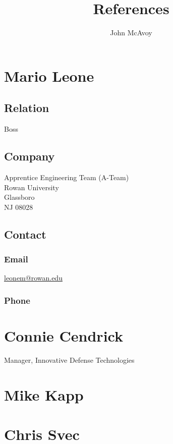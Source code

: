 \documentclass{article}
\title{References}
\author{John McAvoy}
\date{}
\begin{document}
\maketitle


\section{Mario Leone}
\subsection{Relation}
Boss
\subsection{Company}
Apprentice Engineering Team (A-Team) \\ Rowan University \\ Glassboro \\ NJ 08028
\subsection{Contact}
\subsubsection{Email}
\href{mailto:leonem@rowan.edu}{leonem@rowan.edu}
\subsubsection{Phone}

\section{Connie Cendrick}
Manager, Innovative Defense Technologies

\section{Mike Kapp}

\section{Chris Svec}
\end{document}
